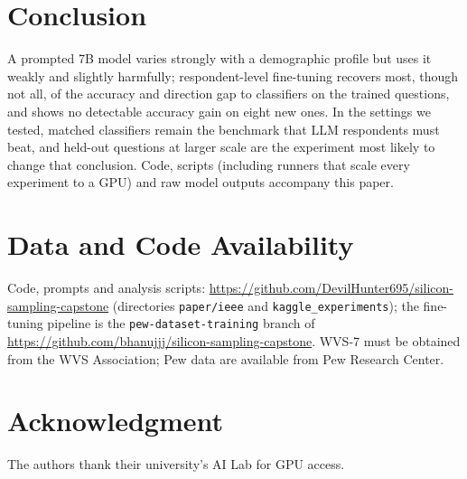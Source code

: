 \documentclass[conference]{IEEEtran}
\begin{document}
\section{Conclusion}

A prompted 7B model varies strongly with a demographic profile but uses it weakly and slightly harmfully; respondent-level fine-tuning recovers most, though not all, of the accuracy and direction gap to classifiers on the trained questions, and shows no detectable accuracy gain on eight new ones. In the settings we tested, matched classifiers remain the benchmark that LLM respondents must beat, and held-out questions at larger scale are the experiment most likely to change that conclusion. Code, scripts (including runners that scale every experiment to a GPU) and raw model outputs accompany this paper.

\section*{Data and Code Availability}
Code, prompts and analysis scripts: \url{https://github.com/DevilHunter695/silicon-sampling-capstone} (directories \texttt{paper/ieee} and \texttt{kaggle\_experiments}); the fine-tuning pipeline is the \texttt{pew-dataset-training} branch of \url{https://github.com/bhanujjj/silicon-sampling-capstone}. WVS-7 must be obtained from the WVS Association; Pew data are available from Pew Research Center.

\section*{Acknowledgment}
The authors thank their university's AI Lab for GPU access.
\end{document}
